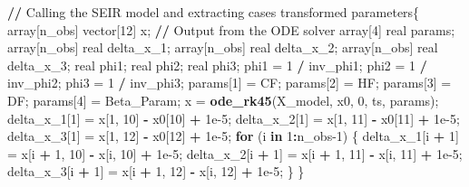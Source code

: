 \documentclass[10pt,letterpaper]{article}
\newenvironment{Shaded}{\begin{snugshade}}{\end{snugshade}}
\newcommand{\ControlFlowTok}[1]{\textcolor[rgb]{0.13,0.29,0.53}{\textbf{#1}}}
\newcommand{\DecValTok}[1]{\textcolor[rgb]{0.00,0.00,0.81}{#1}}
\newcommand{\ErrorTok}[1]{\textcolor[rgb]{0.64,0.00,0.00}{\textbf{#1}}}
\newcommand{\FloatTok}[1]{\textcolor[rgb]{0.00,0.00,0.81}{#1}}
\newcommand{\FunctionTok}[1]{\textcolor[rgb]{0.13,0.29,0.53}{\textbf{#1}}}
\newcommand{\NormalTok}[1]{#1}
\newcommand{\OtherTok}[1]{\textcolor[rgb]{0.56,0.35,0.01}{#1}}
\newcommand{\SpecialCharTok}[1]{\textcolor[rgb]{0.81,0.36,0.00}{\textbf{#1}}}
\begin{document}
\begin{Shaded}
\begin{Highlighting}[]
\SpecialCharTok{/}\ErrorTok{/}\NormalTok{ Calling the SEIR model and extracting cases}
\NormalTok{transformed parameters\{}
\NormalTok{  array[n\_obs] vector[}\DecValTok{12}\NormalTok{] x; }\SpecialCharTok{/}\ErrorTok{/}\NormalTok{ Output from the ODE solver}
\NormalTok{  array[}\DecValTok{4}\NormalTok{] real params;}
\NormalTok{  array[n\_obs] real delta\_x\_1;}
\NormalTok{  array[n\_obs] real delta\_x\_2;}
\NormalTok{  array[n\_obs] real delta\_x\_3;}
\NormalTok{  real phi1;}
\NormalTok{  real phi2;}
\NormalTok{  real phi3;}
\NormalTok{  phi1 }\OtherTok{=} \DecValTok{1} \SpecialCharTok{/}\NormalTok{ inv\_phi1;}
\NormalTok{  phi2 }\OtherTok{=} \DecValTok{1} \SpecialCharTok{/}\NormalTok{ inv\_phi2;}
\NormalTok{  phi3 }\OtherTok{=} \DecValTok{1} \SpecialCharTok{/}\NormalTok{ inv\_phi3;}
\NormalTok{  params[}\DecValTok{1}\NormalTok{] }\OtherTok{=}\NormalTok{ CF;}
\NormalTok{  params[}\DecValTok{2}\NormalTok{] }\OtherTok{=}\NormalTok{ HF;}
\NormalTok{  params[}\DecValTok{3}\NormalTok{] }\OtherTok{=}\NormalTok{ DF;}
\NormalTok{  params[}\DecValTok{4}\NormalTok{] }\OtherTok{=}\NormalTok{ Beta\_Param;}
\NormalTok{  x }\OtherTok{=} \FunctionTok{ode\_rk45}\NormalTok{(X\_model, x0, }\DecValTok{0}\NormalTok{, ts, params);}
\NormalTok{  delta\_x\_1[}\DecValTok{1}\NormalTok{] }\OtherTok{=}\NormalTok{  x[}\DecValTok{1}\NormalTok{, }\DecValTok{10}\NormalTok{] }\SpecialCharTok{{-}}\NormalTok{ x0[}\DecValTok{10}\NormalTok{] }\SpecialCharTok{+} \FloatTok{1e{-}5}\NormalTok{;}
\NormalTok{  delta\_x\_2[}\DecValTok{1}\NormalTok{] }\OtherTok{=}\NormalTok{  x[}\DecValTok{1}\NormalTok{, }\DecValTok{11}\NormalTok{] }\SpecialCharTok{{-}}\NormalTok{ x0[}\DecValTok{11}\NormalTok{] }\SpecialCharTok{+} \FloatTok{1e{-}5}\NormalTok{;}
\NormalTok{  delta\_x\_3[}\DecValTok{1}\NormalTok{] }\OtherTok{=}\NormalTok{  x[}\DecValTok{1}\NormalTok{, }\DecValTok{12}\NormalTok{] }\SpecialCharTok{{-}}\NormalTok{ x0[}\DecValTok{12}\NormalTok{] }\SpecialCharTok{+} \FloatTok{1e{-}5}\NormalTok{;}
  \ControlFlowTok{for}\NormalTok{ (i }\ControlFlowTok{in} \DecValTok{1}\SpecialCharTok{:}\NormalTok{n\_obs}\DecValTok{{-}1}\NormalTok{) \{}
\NormalTok{    delta\_x\_1[i }\SpecialCharTok{+} \DecValTok{1}\NormalTok{] }\OtherTok{=}\NormalTok{ x[i }\SpecialCharTok{+} \DecValTok{1}\NormalTok{, }\DecValTok{10}\NormalTok{] }\SpecialCharTok{{-}}\NormalTok{ x[i, }\DecValTok{10}\NormalTok{] }\SpecialCharTok{+} \FloatTok{1e{-}5}\NormalTok{;}
\NormalTok{    delta\_x\_2[i }\SpecialCharTok{+} \DecValTok{1}\NormalTok{] }\OtherTok{=}\NormalTok{ x[i }\SpecialCharTok{+} \DecValTok{1}\NormalTok{, }\DecValTok{11}\NormalTok{] }\SpecialCharTok{{-}}\NormalTok{ x[i, }\DecValTok{11}\NormalTok{] }\SpecialCharTok{+} \FloatTok{1e{-}5}\NormalTok{;}
\NormalTok{    delta\_x\_3[i }\SpecialCharTok{+} \DecValTok{1}\NormalTok{] }\OtherTok{=}\NormalTok{ x[i }\SpecialCharTok{+} \DecValTok{1}\NormalTok{, }\DecValTok{12}\NormalTok{] }\SpecialCharTok{{-}}\NormalTok{ x[i, }\DecValTok{12}\NormalTok{] }\SpecialCharTok{+} \FloatTok{1e{-}5}\NormalTok{;}
\NormalTok{  \}}
\NormalTok{\}}


\end{Highlighting}
\end{Shaded}
\end{document}
